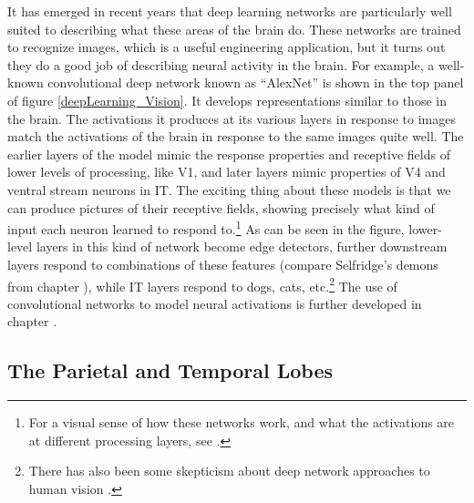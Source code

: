 It has emerged in recent years that deep learning networks are particularly well suited to describing what these areas of the brain do. These networks are trained to recognize images, which is a useful engineering application, but it turns out they do a good job of describing neural activity in the brain. For example, a well-known convolutional deep network known as ``AlexNet'' \cite{krizhevsky2012imagenet} is shown in the top panel of figure \ref{deepLearning_Vision}. It develops representations similar to those in the brain. The activations it produces at its various layers in response to images match the activations of the brain in response to the same images quite well. The earlier layers of the model mimic the response properties and receptive fields of lower levels of processing, like V1, and later layers mimic properties of V4 and ventral stream neurons in IT. The exciting thing about these models is that we can produce pictures of their receptive fields, showing precisely what kind of input each neuron learned to respond to.\footnote{For a visual sense of how these networks work, and what the activations are at different processing layers, see .}  As can be seen in the figure, lower-level layers in this kind of network become edge detectors, further downstream layers respond to combinations of these features (compare Selfridge's demons from chapter ), while IT layers respond to dogs, cats, etc.\footnote{There has also been some skepticism about deep network approaches to human vision \cite{bowers2022deep}.} The use of convolutional networks to model neural activations is further developed in chapter .

\subsection{The Parietal and Temporal Lobes}\label{parietalTemporalLobes}


